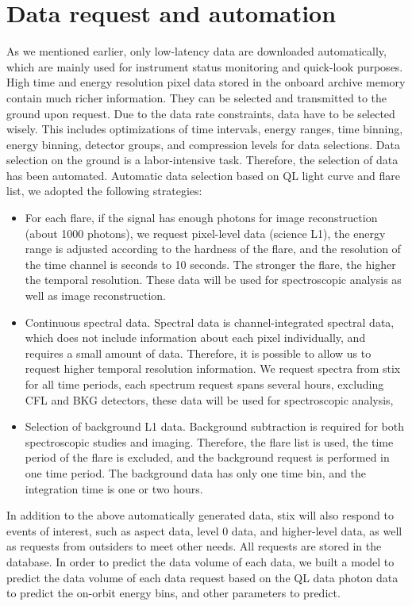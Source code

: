 \documentclass{aa}
\begin{document}
\section{Data request and automation}
As we mentioned earlier, only low-latency data are downloaded automatically,
which are mainly used for instrument status monitoring and quick-look purposes. 
High time and energy resolution pixel data stored in the onboard archive memory contain much richer information.
They can be selected and transmitted to the ground upon request.
Due to the data rate constraints,  data have to be selected wisely. 
This includes optimizations of time intervals, 
energy ranges, time binning, energy binning, detector groups,  and compression levels for data selections. 
Data selection on the ground is a labor-intensive task. 
Therefore, the selection of data has been automated. 
Automatic data selection based on QL light curve and flare list, we adopted the following strategies:
\begin{itemize}
  \item For each flare, if the signal has enough photons for image reconstruction (about 1000 photons), 
  we request pixel-level data (science L1), the energy range is adjusted according to the hardness of the flare, 
  and the resolution of the time channel is seconds to 10 seconds. 
  The stronger the flare, the higher the temporal resolution. These data will be used for spectroscopic analysis as well as image reconstruction.
\item Continuous spectral data. Spectral data is channel-integrated spectral data,
 which does not include information about each pixel individually,
  and requires a small amount of data. Therefore, it is possible to allow us to request higher temporal resolution information.
   We request spectra from stix for all time periods, each spectrum request spans several hours, 
   excluding CFL and BKG detectors, these data will be used for spectroscopic analysis,
\item Selection of background L1 data. 
Background subtraction is required for both spectroscopic studies and imaging. 
Therefore, the flare list is used, the time period of the flare is excluded, and the background request is performed in one time period. 
The background data has only one time bin, and the integration time is one or two hours.
\end{itemize}
In addition to the above automatically generated data, stix will also 
respond to events of interest, such as aspect data, level 0 data, and higher-level data, 
as well as requests from outsiders to meet other needs. All requests are stored in the database.
In order to predict the data volume of each data,
 we built a model to predict the data volume of each data request based on the QL data photon data to predict the on-orbit energy bins, and other parameters to predict.
\end{document}
